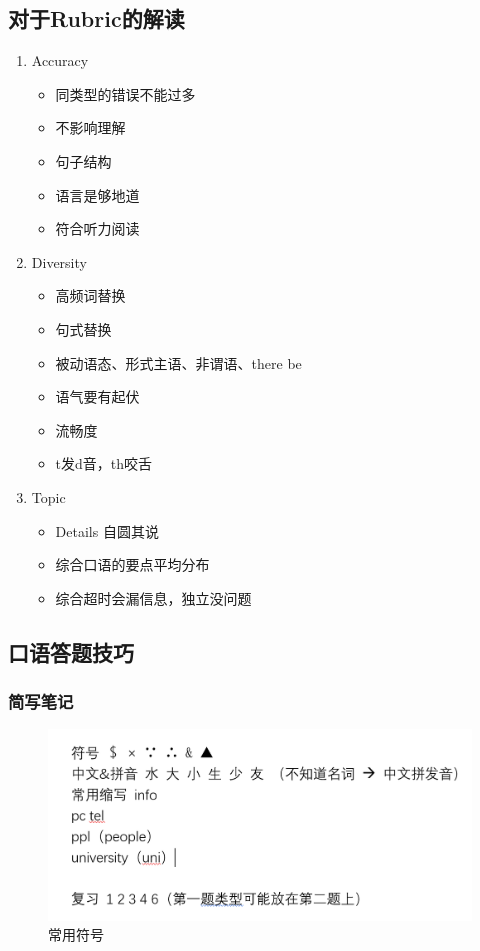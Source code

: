 \documentclass[UTF8]{ctexart}
\begin{document}
\subsection{对于Rubric的解读}
\begin{enumerate}[A]
  \item Accuracy
  \begin{itemize}
    \item 同类型的错误不能过多
    \item 不影响理解
    \item 句子结构
    \item 语言是够地道
    \item 符合听力阅读
  \end{itemize}
  \item Diversity
  \begin{itemize}
    \item 高频词替换
    \item 句式替换
    \item 被动语态、形式主语、非谓语、there be
    \item 语气要有起伏
    \item 流畅度
    \item t发d音，th咬舌
  \end{itemize}
  \item Topic
  \begin{itemize}
    \item Details 自圆其说
    \item 综合口语的要点平均分布
    \item 综合超时会漏信息，独立没问题
  \end{itemize}
\end{enumerate}
\subsection{口语答题技巧}
\subsubsection{简写笔记}
  \begin{figure}[ht]
    \centering
    \includegraphics[scale=0.6]{kouyu1.png}
    \caption{常用符号}
    \end{figure}
\end{document}
